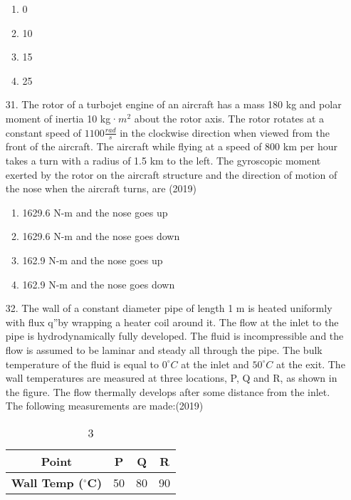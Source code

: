 \documentclass[journal]{IEEEtran}
\begin{document}
\begin{enumerate}
    \begin{enumerate}[label=(\Alph*)]
        \item 0
        \item 10
        \item 15
        \item 25
    \end{enumerate}
    \item[31.] The rotor of a turbojet engine of an aircraft has a mass 180 kg and polar moment of inertia 10 kg·$m^2$ about the rotor axis. The rotor rotates at a constant speed of $1100 \frac{rad}{s}$ in the clockwise direction when viewed from the front of the aircraft. The aircraft while flying at a speed of 800 km per hour takes a turn with a radius of 1.5 km to the left. The gyroscopic moment exerted by the rotor on the aircraft structure and the direction of motion of the nose when the aircraft turns, are \hfill (2019)
    \begin{enumerate}[label=(\Alph*)]
        \item 1629.6 N-m and the nose goes up
        \item 1629.6 N-m and the nose goes down
        \item 162.9 N-m and the nose goes up
        \item 162.9 N-m and the nose goes down
    \end{enumerate}
    \item[32.] The wall of a constant diameter pipe of length 1 m is heated uniformly with flux q''by wrapping a heater coil around it. The flow at the inlet to the pipe is hydrodynamically fully developed. The fluid is incompressible and the flow is assumed to be laminar and steady all through the pipe. The bulk temperature of the fluid is equal to  $0^{\circ}C$ at the inlet and $50^{\circ}C$ at the exit. The wall temperatures are measured at three locations, P, Q and R, as shown in the figure. The flow thermally develops  after some distance from the inlet. The following measurements are made:\hfill (2019)
    \begin{table}
        \centering
        \begin{tabular}{|c|c|c|c|}
            \hline
            \textbf{Point} & P & Q & R \\
            \hline
            \textbf{Wall Temp ($^{\circ}$C)} & 50 & 80 & 90 \\
            \hline
         \end{tabular}  %
        \caption{3}

\end{table}
\end{enumerate}
\end{document}
